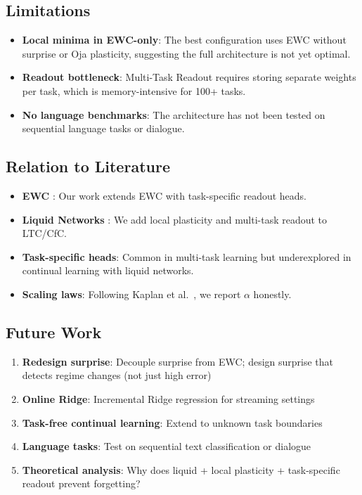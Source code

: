 \documentclass[11pt,a4paper]{article}
\begin{document}
\subsection{Limitations}

\begin{itemize}
    \item \textbf{Local minima in EWC-only}: The best configuration uses EWC without surprise or Oja plasticity, suggesting the full architecture is not yet optimal.
    \item \textbf{Readout bottleneck}: Multi-Task Readout requires storing separate weights per task, which is memory-intensive for 100+ tasks.
    \item \textbf{No language benchmarks}: The architecture has not been tested on sequential language tasks or dialogue.
\end{itemize}

\subsection{Relation to Literature}

\begin{itemize}
    \item \textbf{EWC} \cite{kirkpatrick2017overcoming}: Our work extends EWC with task-specific readout heads.
    \item \textbf{Liquid Networks} \cite{hasani2022liquid,chahine2023robust}: We add local plasticity and multi-task readout to LTC/CfC.
    \item \textbf{Task-specific heads}: Common in multi-task learning but underexplored in continual learning with liquid networks.
    \item \textbf{Scaling laws}: Following Kaplan et al.\ \cite{kaplan2020scaling}, we report $\alpha$ honestly.
\end{itemize}

\subsection{Future Work}

\begin{enumerate}
    \item \textbf{Redesign surprise}: Decouple surprise from EWC; design surprise that detects regime changes (not just high error)
    \item \textbf{Online Ridge}: Incremental Ridge regression for streaming settings
    \item \textbf{Task-free continual learning}: Extend to unknown task boundaries
    \item \textbf{Language tasks}: Test on sequential text classification or dialogue
    \item \textbf{Theoretical analysis}: Why does liquid + local plasticity + task-specific readout prevent forgetting?
\end{enumerate}
\end{document}
